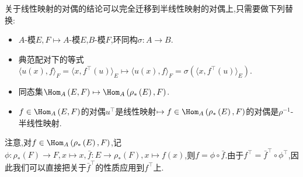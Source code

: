 \begin{remark}{}{}
	关于线性映射的对偶的结论可以完全迁移到半线性映射的对偶上,只需要做下列替换:
	\begin{itemize}
		\item $A$-模$E,F\mapsto A$-模$E$,$B$-模$F$,环同构$\sigma:A\to B$.
		\item 典范配对下的等式$\langle u\left(x\right),f\rangle_{F}=\langle x,f^{\top}\left(u\right)\rangle_{E}\mapsto \langle u\left(x\right),f\rangle_{F}=\sigma\left(\langle x,f^{\top}\left(u\right)\rangle_{E}\right)$.
		\item 同态集$\Hom_{A}\left(E,F\right)\mapsto\Hom_{A}\left(\rho_{\ast}\left(E\right),F\right)$.
		\item $f\in\Hom_{A}\left(E,F\right)$的对偶$u^{\top}$是线性映射$\mapsto f\in\Hom_{A}\left(\rho_{\ast}\left(E\right),F\right)$的对偶是$\rho^{-1}$-半线性映射.
	\end{itemize}
	注意,对$f\in\Hom_{A}\left(\rho_{\ast}\left(E\right),F\right)$,记$\phi:\rho_{\ast}\left(F\right)\to F,x\mapsto x,\bar{f}:E\to\rho_{\ast}\left(F\right),x\mapsto f\left(x\right)$,则$f=\phi\circ\bar{f}$.由于$f^{\top}=\bar{f}^{\top}\circ\phi^{\top}$,因此我们可以直接把关于$\bar{f}^{\top}$的性质应用到$f^{\top}$上.
\end{remark}

























